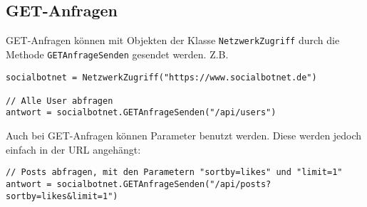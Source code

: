 \documentclass[parskip=half*]{scrartcl}
\begin{document}
\subsection*{GET-Anfragen}
GET-Anfragen können mit Objekten der Klasse \lstinline{NetzwerkZugriff} durch die Methode \lstinline{GETAnfrageSenden} gesendet werden. Z.B.
\begin{lstlisting}
socialbotnet = NetzwerkZugriff("https://www.socialbotnet.de")

// Alle User abfragen
antwort = socialbotnet.GETAnfrageSenden("/api/users")
\end{lstlisting}
\vspace{0.25cm}

Auch bei GET-Anfragen können Parameter benutzt werden. Diese werden jedoch einfach in der URL angehängt:
\begin{lstlisting}
// Posts abfragen, mit den Parametern "sortby=likes" und "limit=1"
antwort = socialbotnet.GETAnfrageSenden("/api/posts?sortby=likes&limit=1")
\end{lstlisting}
\newpage
\end{document}
